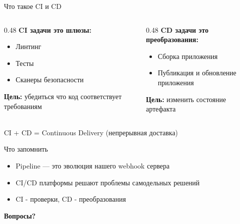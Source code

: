 \documentclass[aspectratio=169]{beamer}
\begin{document}
    \begin{frame}{Что такое CI и CD}
        \begin{columns}[t]
            \begin{column}[t]{0.48\textwidth}
                \textbf{CI задачи это шлюзы:}
                \begin{itemize}
                    \item Линтинг
                    \item Тесты
                    \item Сканеры безопасности
                \end{itemize}
                
                \vspace{0.3cm}
                \textbf{Цель:} убедиться что код соответствует требованиям
            \end{column}
            
            \begin{column}[t]{0.48\textwidth}
                \textbf{CD задачи это преобразования:}
                \begin{itemize}
                    \item Сборка приложения
                    \item Публикация и обновление приложения
                \end{itemize}
                
                \vspace{0.3cm}
                \textbf{Цель:} изменить состояние артефакта
            \end{column}
        \end{columns}
        
        \vspace{0.5cm}
        
        CI + CD = Continuous Delivery (непрерывная доставка)
    \end{frame}


    \begin{frame}{Что запомнить}
        \begin{itemize}
            \item Pipeline — это эволюция нашего webhook сервера
            \item CI/CD платформы решают проблемы самодельных решений
            \item CI - проверки, CD - преобразования
        \end{itemize}

        \vspace{0.5cm}

        \begin{center}
            \textbf{Вопросы?}
        \end{center}
    \end{frame}
\end{document}
